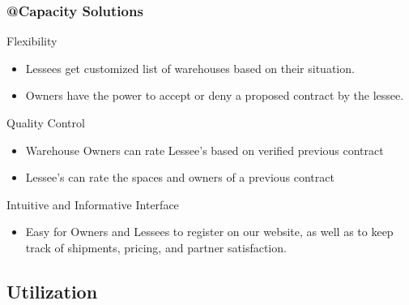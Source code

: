 \documentclass{beamer}
\begin{document}
\begin{frame}
\frametitle{@Capacity Solutions} \footnotesize
\begin{block}{Flexibility}
\begin{itemize}
\item Lessees get customized list of warehouses based on their situation.
\item Owners have the power to accept or deny a proposed contract by the lessee. 
\end{itemize}
\end{block}
\begin{block}{Quality Control}
\begin{itemize}
\item Warehouse Owners can rate Lessee's based on verified previous contract
\item Lessee's can rate the spaces and owners of a previous contract
\end{itemize}
\end{block}
\begin{block}{Intuitive and Informative Interface}
\begin{itemize}
\item Easy for Owners and Lessees to register on our website, as well as to keep track of shipments, pricing, and partner satisfaction.
\end{itemize}
\end{block}
\end{frame}

\subsection{Utilization}


\end{document}
